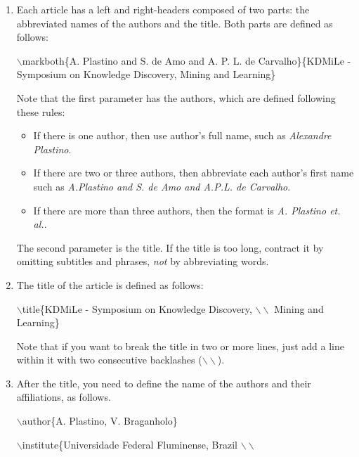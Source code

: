 \documentclass[kdmile,a4paper]{kdmile} %
\newenvironment{latexcode}
{\ttfamily\vspace{0.1in}\setlength{\parindent}{18pt}}
{\vspace{0.1in}}
\begin{document}
\begin{enumerate}

	\item Each article has a left and right-headers composed of two parts: the abbreviated names of the authors and the title. Both parts are defined as follows:
	
		\begin{latexcode} 
			$\backslash$markboth\{A. Plastino and S. de Amo and A. P. L. de Carvalho\}\{KDMiLe - Symposium on Knowledge Discovery,  Mining and Learning\} 
		\end{latexcode}
	
		Note that the first parameter has the authors, which are defined following these rules:
		
\begin{itemize}
	\item If there is one author, then use author's full name, such as \textit{Alexandre Plastino}.
	\item If there are two or three authors, then abbreviate each author's first name such as \textit{A.Plastino and S. de Amo and A.P.L. de Carvalho}.
	\item If there are more than three authors, then the format is \textit{A. Plastino et. al.}.
\end{itemize}
	
	The second parameter is the title. If the title is too long, contract it by omitting subtitles and phrases, \textit{not} by abbreviating words.
	
	\item The title of the article is defined as follows:
	
		\begin{latexcode}
				$\backslash$title\{KDMiLe - Symposium on Knowledge Discovery,  $\backslash\backslash$ Mining and Learning\}
		\end{latexcode}
	
		Note that if you want to break the title in two or more lines, just add a line within it with two consecutive backlashes ($\backslash\backslash$).
	
	\item After the title, you need to define the name of the authors and their affiliations, as follows.

		\begin{latexcode}
				$\backslash$author\{A. Plastino, V. Braganholo\}
				
				$\backslash$institute\{Universidade Federal Fluminense, Brazil $\backslash\backslash$
				

\end{latexcode}
\end{enumerate}
\end{document}
